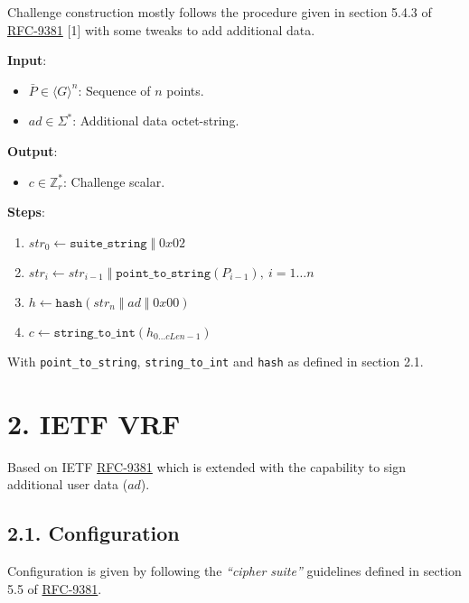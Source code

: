 \documentclass[
]{article}
\providecommand{\tightlist}{%
  \setlength{\itemsep}{0pt}\setlength{\parskip}{0pt}}
\begin{document}
Challenge construction mostly follows the procedure given in section
5.4.3 of \href{https://datatracker.ietf.org/doc/rfc9381}{RFC-9381}
{[}1{]} with some tweaks to add additional data.

\textbf{Input}:

\begin{itemize}
\tightlist
\item
  \(\bar{P} \in \langle G \rangle^n\): Sequence of \(n\) points.
\item
  \(ad \in \Sigma^*\): Additional data octet-string.
\end{itemize}

\textbf{Output}:

\begin{itemize}
\tightlist
\item
  \(c \in \mathbb{Z}^*_r\): Challenge scalar.
\end{itemize}

\textbf{Steps}:

\begin{enumerate}
\def\labelenumi{\arabic{enumi}.}
\tightlist
\item
  \(str_0 \gets \texttt{suite\_string}\;\Vert\;0x02\)
\item
  \(str_i \gets str_{i-1}\;\Vert\;\texttt{point\_to\_string}(P_{i-1}),\ i = 1 \dots n\)
\item
  \(h \gets \texttt{hash}(str_n\;\Vert\;ad\;\Vert\;0x00)\)
\item
  \(c \gets \texttt{string\_to\_int}(h_{0 \dots cLen - 1})\)
\end{enumerate}

With \texttt{point\_to\_string}, \texttt{string\_to\_int} and
\texttt{hash} as defined in section 2.1.

\section{2. IETF VRF}\label{ietf-vrf}

Based on IETF \href{https://datatracker.ietf.org/doc/rfc9381}{RFC-9381}
which is extended with the capability to sign additional user data
(\(ad\)).

\subsection{2.1. Configuration}\label{configuration}

Configuration is given by following the \emph{``cipher suite''}
guidelines defined in section 5.5 of
\href{https://datatracker.ietf.org/doc/rfc9381}{RFC-9381}.
\end{document}
